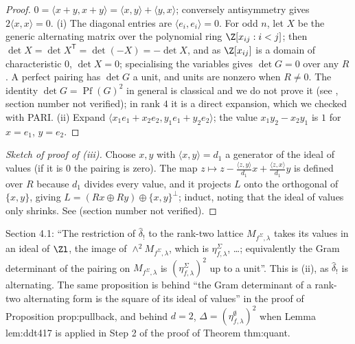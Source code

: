 \begin{proof}
$0=\langle x+y,x+y\rangle=\langle x,y\rangle+\langle y,x\rangle$; conversely antisymmetry gives $2\langle x,x\rangle=0$.
(i) The diagonal entries are $\langle e_i,e_i\rangle=0$. For odd $n$, let $X$ be the generic alternating matrix over the polynomial ring
$\Z[x_{ij}:i<j]$; then $\det X=\det X^{\mathsf T}=\det(-X)=-\det X$, and as $\Z[x_{ij}]$ is a domain of characteristic $0$, $\det X=0$; specialising the
variables gives $\det G=0$ over any $R$. A perfect pairing has $\det G$ a unit, and units are nonzero when $R\ne0$. The identity $\det G=\operatorname{Pf}(G)^2$
in general is classical and we do not prove it (see \cite[Chapter XV, Section 9]{Lang}, section number not verified); in rank $4$ it is a
direct expansion, which we checked with PARI.
(ii) Expand $\langle x_1e_1+x_2e_2,y_1e_1+y_2e_2\rangle$; the value $x_1y_2-x_2y_1$ is $1$ for $x=e_1$, $y=e_2$.
\end{proof}

\begin{proof}[Sketch of proof of (iii)]
Choose $x,y$ with $\langle x,y\rangle=d_1$ a generator of the ideal of values (if it is $0$ the pairing is zero). The map
$z\mapsto z-\frac{\langle z,y\rangle}{d_1}x+\frac{\langle z,x\rangle}{d_1}y$ is defined over $R$ because $d_1$ divides every value, and it projects $L$ onto the orthogonal of
$\{x,y\}$, giving $L=(Rx\oplus Ry)\oplus\{x,y\}^\perp$; induct, noting that the ideal of values only shrinks. See \cite[Chapter XV, Section 8]{Lang}
(section number not verified).
\end{proof}

\begin{paperlink}\label{pl:modules:alternating}
Section 4.1: ``The restriction of $\hat\delta_!$ to the rank-two lattice $M_{f^\Sigma,\lambda}$ takes its values in an ideal of $\Zl$, the image of
$\wedge^2M_{f^\Sigma,\lambda}$, which is $\eta^\Sigma_{f,\lambda}$, \dots; equivalently the Gram determinant of the pairing on $M_{f^\Sigma,\lambda}$ is $(\eta^\Sigma_{f,\lambda})^2$ up to a unit''. This is
(ii), as $\hat\delta_!$ is alternating. The same proposition is behind ``the Gram determinant of a rank-two alternating
form is the square of its ideal of values'' in the proof of Proposition prop:pullback, and behind $d=2$, $\Delta=(\eta^\emptyset_{f,\lambda})^2$ when Lemma
lem:ddt417 is applied in Step 2 of the proof of Theorem thm:quant.
\end{paperlink}

